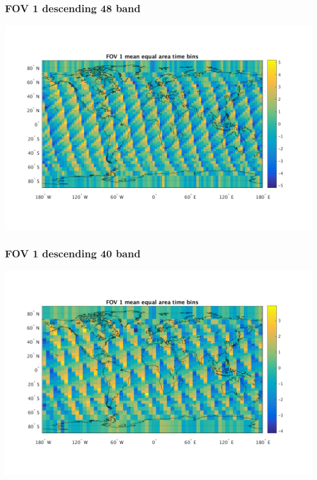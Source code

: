\documentclass[11pt]{beamer}
\begin{document}
\begin{frame}
\frametitle{FOV 1 descending 48 band}
\begin{center}
  \includegraphics[scale=0.5]{slackfigs/FOV_1_48_bin_desc.png}
\end{center}
\end{frame} %
\begin{frame}
\frametitle{FOV 1 descending 40 band}
\begin{center}
  \includegraphics[scale=0.5]{slackfigs/FOV_1_40_bin_desc.png}
\end{center}
\end{frame} %
\end{document}
